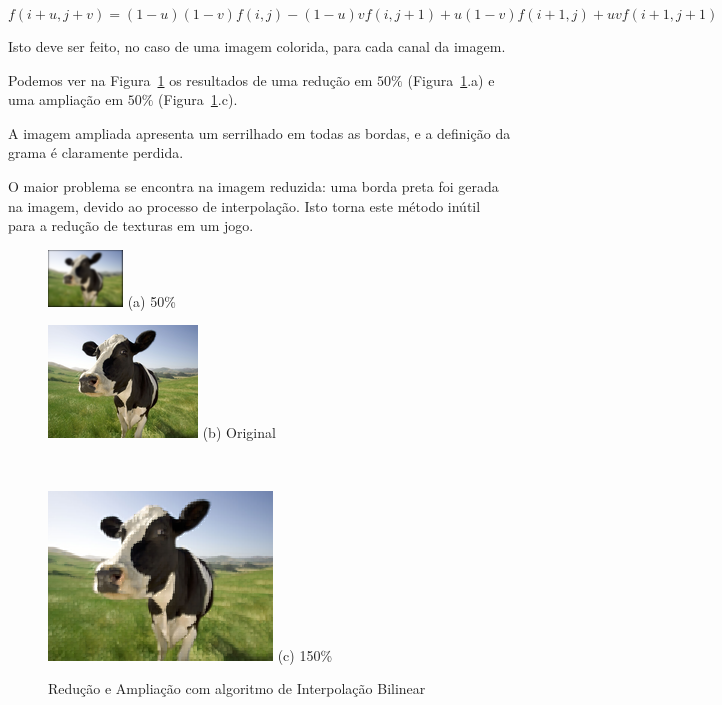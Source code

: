 \documentclass[12pt]{article}
\begin{document}
\[
f(i + u, j + v) = (1-u)(1-v)f(i,j)-(1-u)vf(i, j+ 1) + u(1-v)f(i+1,j) + uvf(i + 1, j+1)
\]

Isto deve ser feito, no caso de uma imagem colorida, para cada canal da imagem.

Podemos ver na Figura~\ref{fig:vaca:bilinear} os resultados de uma redução em $50\%$ (Figura~\ref{fig:vaca:bilinear}.a) e uma ampliação em $50\%$ (Figura~\ref{fig:vaca:bilinear}.c).

A imagem ampliada apresenta um serrilhado em todas as bordas, e a definição da grama é claramente perdida.

O maior problema se encontra na imagem reduzida: uma borda preta foi gerada na imagem, devido ao processo de interpolação. Isto torna este método inútil para a redução de texturas em um jogo.

\begin{figure}[H]
    \begin{minipage}{.2\textwidth}
        \centering
        \includegraphics{cow_bilinear_smallest}
        (a) 50\%
    \end{minipage}%
    \begin{minipage}{0.35\textwidth}
        \centering
        \includegraphics{cow_very_small}
        (b) Original
    \end{minipage}~
    \begin{minipage}{0.35\textwidth}
        \centering
        \includegraphics{cow_bilinear}
        (c) 150\%
    \end{minipage}
    \caption{Redução e Ampliação com algoritmo de Interpolação Bilinear}
    \label{fig:vaca:bilinear}
\end{figure}
\end{document}
